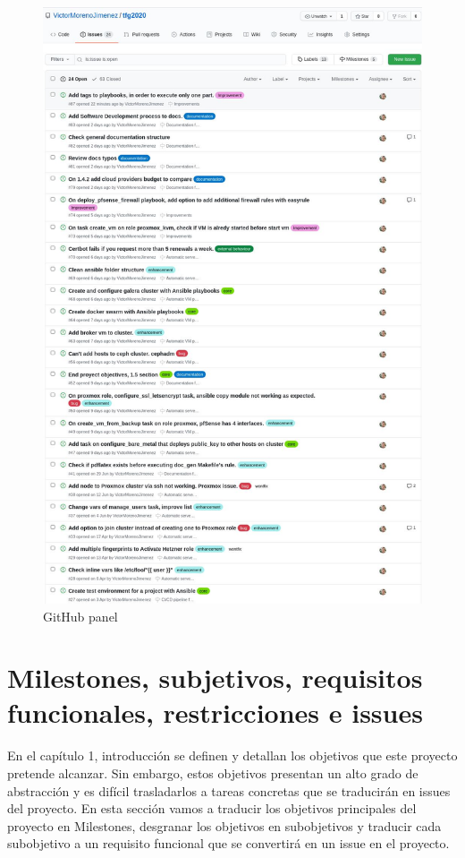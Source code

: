 \begin{text}
	\begin{figure}[!hbt]
		\centering
		\includegraphics[scale=0.5]{imagenes/Analisis/githubissues.jpg}
		\caption[GitHub panel]{GitHub panel}
		\label{github_issues}
	\end{figure}
\end{text}
\clearpage

\section{Milestones, subjetivos, requisitos funcionales, restricciones e issues}
	\begin{text}
		En el capítulo 1, introducción se definen y detallan los objetivos que este proyecto pretende alcanzar. Sin embargo, estos objetivos presentan un alto grado de abstracción y es difícil trasladarlos a tareas concretas que se traducirán en issues del proyecto. En esta sección vamos a traducir los objetivos principales del proyecto en Milestones, desgranar los objetivos en subobjetivos y traducir cada subobjetivo a un requisito funcional que se convertirá en un issue en el proyecto.
	\end{text}

